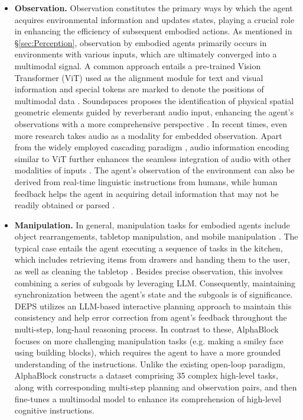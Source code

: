 \begin{itemize}[leftmargin=*]
    \item \textbf{Observation.}
    Observation constitutes the primary ways by which the agent acquires environmental information and updates states, playing a crucial role in enhancing the efficiency of subsequent embodied actions. As mentioned in \S \ref{sec:Perception}, observation by embodied agents primarily occurs in environments with various inputs, which are ultimately converged into a multimodal signal. A common approach entails a pre-trained Vision Transformer (ViT) used as the alignment module for text and visual information and special tokens are marked to denote the positions of multimodal data \cite{DBLP:conf/icml/DriessXSLCIWTVY23, liu2022instruction, DBLP:journals/corr/abs-2305-15021}. 
    Soundspaces \cite{DBLP:conf/eccv/ChenJSGAIRG20} proposes the identification of physical spatial geometric elements guided by reverberant audio input, enhancing the agent's observations with a more comprehensive perspective \cite{DBLP:conf/nips/00070C22}. In recent times, even more research takes audio as a modality for embedded observation. Apart from the widely employed cascading paradigm \cite{DBLP:journals/corr/abs-2304-12995, DBLP:conf/nips/Huang0LCZ22, DBLP:conf/icml/RadfordKXBMS23}, audio information encoding similar to ViT further enhances the seamless integration of audio with other modalities of inputs \cite{DBLP:conf/interspeech/GongCG21}. 
    The agent's observation of the environment can also be derived from real-time linguistic instructions from humans, while human feedback helps the agent in acquiring detail information that may not be readily obtained or parsed \cite{DBLP:journals/corr/abs-2210-06407, DBLP:journals/corr/abs-2305-16291}.

    \item \textbf{Manipulation.}
    In general, manipulation tasks for embodied agents include object rearrangements, tabletop manipulation, and mobile manipulation \cite{DBLP:journals/corr/abs-2305-13246, DBLP:conf/icml/DriessXSLCIWTVY23}. The typical case entails the agent executing a sequence of tasks in the kitchen, which includes retrieving items from drawers and handing them to the user, as well as cleaning the tabletop \cite{DBLP:conf/corl/IchterBCFHHHIIJ22}. Besides precise observation, this involves combining a series of subgoals by leveraging LLM. Consequently, maintaining synchronization between the agent's state and the subgoals is of significance. DEPS \cite{DBLP:journals/corr/abs-2302-01560} utilizes an LLM-based interactive planning approach to maintain this consistency and help error correction from agent's feedback throughout the multi-step, long-haul reasoning process.
    In contrast to these, AlphaBlock \cite{DBLP:journals/corr/abs-2305-18898} focuses on more challenging manipulation tasks (e.g. making a smiley face using building blocks), which requires the agent to have a more grounded understanding of the instructions. Unlike the existing open-loop paradigm, AlphaBlock constructs a dataset comprising 35 complex high-level tasks, along with corresponding multi-step planning and observation pairs, and then fine-tunes a multimodal model to enhance its comprehension of high-level cognitive instructions.


\end{itemize}
